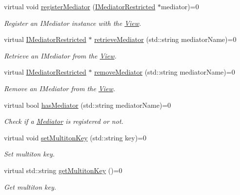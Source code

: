\begin{DoxyCompactItemize}
virtual void \hyperlink{class_pure_m_v_c_1_1_i_view_a16db7b04ff8a9f03b65ae4c9beecb48d}{registerMediator} (\hyperlink{class_pure_m_v_c_1_1_i_mediator_restricted}{IMediatorRestricted} $\ast$mediator)=0
\begin{DoxyCompactList}\small\item\em Register an {\ttfamily IMediator} instance with the {\ttfamily \hyperlink{class_pure_m_v_c_1_1_view}{View}}. \item\end{DoxyCompactList}\item 
virtual \hyperlink{class_pure_m_v_c_1_1_i_mediator_restricted}{IMediatorRestricted} $\ast$ \hyperlink{class_pure_m_v_c_1_1_i_view_abf6f388473042970e62d52705b1448dc}{retrieveMediator} (std::string mediatorName)=0
\begin{DoxyCompactList}\small\item\em Retrieve an {\ttfamily IMediator} from the {\ttfamily \hyperlink{class_pure_m_v_c_1_1_view}{View}}. \item\end{DoxyCompactList}\item 
virtual \hyperlink{class_pure_m_v_c_1_1_i_mediator_restricted}{IMediatorRestricted} $\ast$ \hyperlink{class_pure_m_v_c_1_1_i_view_a569728502b696d2e195b80ebfd8b85eb}{removeMediator} (std::string mediatorName)=0
\begin{DoxyCompactList}\small\item\em Remove an {\ttfamily IMediator} from the {\ttfamily \hyperlink{class_pure_m_v_c_1_1_view}{View}}. \item\end{DoxyCompactList}\item 
virtual bool \hyperlink{class_pure_m_v_c_1_1_i_view_a04387bea6dd82b8a34ea47b51938ccc5}{hasMediator} (std::string mediatorName)=0
\begin{DoxyCompactList}\small\item\em Check if a \hyperlink{class_pure_m_v_c_1_1_mediator}{Mediator} is registered or not. \item\end{DoxyCompactList}\item 
virtual void \hyperlink{class_pure_m_v_c_1_1_i_multiton_key_heir_a03acb75ab79defba2c28b8de1bbe1ca6}{setMultitonKey} (std::string key)=0
\begin{DoxyCompactList}\small\item\em Set multiton key. \item\end{DoxyCompactList}\item 
virtual std::string \hyperlink{class_pure_m_v_c_1_1_i_multiton_key_heir_aecccfb9898368c6377550ceae5730934}{getMultitonKey} ()=0
\begin{DoxyCompactList}\small\item\em Get multiton key. \item\end{DoxyCompactList}\end{DoxyCompactItemize}


